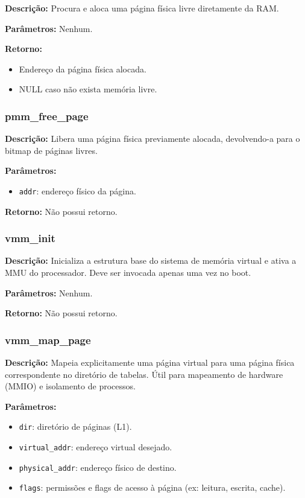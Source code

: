 \textbf{Descrição:}
Procura e aloca uma página física livre diretamente da RAM.

\textbf{Parâmetros:}
Nenhum.

\textbf{Retorno:}
\begin{itemize}
\item Endereço da página física alocada.
\item NULL caso não exista memória livre.
\end{itemize}

\subsubsection{pmm\_free\_page}

\textbf{Descrição:}
Libera uma página física previamente alocada, devolvendo-a para o bitmap de páginas livres.

\textbf{Parâmetros:}
\begin{itemize}
\item \texttt{addr}: endereço físico da página.
\end{itemize}

\textbf{Retorno:}
Não possui retorno.

\subsubsection{vmm\_init}

\textbf{Descrição:}
Inicializa a estrutura base do sistema de memória virtual e ativa a MMU do processador. Deve ser invocada apenas uma vez no boot.

\textbf{Parâmetros:}
Nenhum.

\textbf{Retorno:}
Não possui retorno.

\subsubsection{vmm\_map\_page}

\textbf{Descrição:}
Mapeia explicitamente uma página virtual para uma página física correspondente no diretório de tabelas. Útil para mapeamento de hardware (MMIO) e isolamento de processos.

\textbf{Parâmetros:}
\begin{itemize}
\item \texttt{dir}: diretório de páginas (L1).
\item \texttt{virtual\_addr}: endereço virtual desejado.
\item \texttt{physical\_addr}: endereço físico de destino.
\item \texttt{flags}: permissões e flags de acesso à página (ex: leitura, escrita, cache).
\end{itemize}

